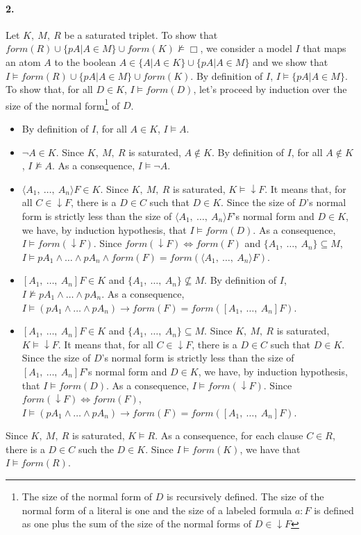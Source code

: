 \documentclass[a4paper,10pt]{report}
\newcommand{\F}{\mathit{form}}
\begin{document}
\paragraph{2.}
Let $K,\ M,\ R$ be a saturated triplet. To show that $\F(R)\cup\{pA|A\in M\}\cup\F(K)\nvDash\Box$,
we consider a model $I$ that maps an atom $A$ to  the boolean $A\in\{A|A\in K\}\cup\{pA|A\in M\}$
and we show that $I\vDash\F(R)\cup\{pA|A\in M\}\cup\F(K)$. By definition of $I$,
$I\vDash\{pA|A\in M\}$. To show that, for all $D\in K$, $I\vDash\F(D)$, let's proceed by induction
over the size of the normal form\footnote{The size of the normal form of $D$ is recursively
defined. The size of the normal form of a literal is one and the size of a labeled formula
$a:F$ is defined as one plus the sum of the size of the normal forms of $D\in\downarrow F$}
of $D$.
\begin{itemize}
 \item By definition of $I$, for all $A\in K$, $I\vDash A$.
 \item $\neg A\in K$. Since $K,\ M,\ R$ is saturated, $A\notin K$.
  By definition of $I$, for all $A\notin K$, $I\nvDash A$. As a consequence,  $I\vDash\neg A$.
 \item $\langle A_1,\ \dots,\ A_n\rangle F\in K$. Since $K,\ M,\ R$ is saturated,
$K\vDash\downarrow F$. It means that, for all $C\in\downarrow F$, there is a $D\in C$ such that
$D\in K$. Since the size of $D$'s normal form is strictly less than the size of
$\langle A_1,\ \dots,\ A_n\rangle F$'s normal form and $D\in K$, we have, by induction hypothesis,
that $I\vDash\F(D)$. As a consequence, $I\vDash\F(\downarrow F)$.
Since $\F(\downarrow F)\Leftrightarrow\F(F)$ and $\{A_1,\ \dots,\ A_n\}\subseteq M$,
$I\vDash pA_1\wedge\dots\wedge pA_n\wedge\F(F)=\F(\langle A_1,\ \dots,\ A_n\rangle F)$.
 \item $[A_1,\ \dots,\ A_n]F\in K$ and $\{A_1,\ \dots,\ A_n\}\nsubseteq M$. By definition of $I$,
$I\nvDash pA_1\wedge\dots\wedge pA_n$. As a consequence,
$I\vDash(pA_1\wedge\dots\wedge pA_n)\rightarrow\F(F)=\F([A_1,\ \dots,\ A_n]F)$.
 \item $[A_1,\ \dots,\ A_n]F\in K$ and $\{A_1,\ \dots,\ A_n\}\subseteq M$.
Since $K,\ M,\ R$ is saturated, $K\vDash\downarrow F$.
It means that, for all $C\in\downarrow F$, there is a $D\in C$ such that $D\in K$.
Since the size of $D$'s normal form is strictly less than the size of $[A_1,\ \dots,\ A_n]F$'s
normal form and $D\in K$, we have, by induction hypothesis, that $I\vDash\F(D)$.
As a consequence, $I\vDash\F(\downarrow F)$. Since $\F(\downarrow F)\Leftrightarrow\F(F)$,
$I\vDash(pA_1\wedge\dots\wedge pA_n)\rightarrow\F(F)=\F([A_1,\ \dots,\ A_n]F)$.
\end{itemize}
Since $K,\ M,\ R$ is saturated, $K\vDash R$. As a consequence, for each clause $C\in R$,
there is a $D\in C$ such the $D\in K$. Since $I\vDash\F(K)$, we have that $I\vDash\F(R)$.
\end{document}
